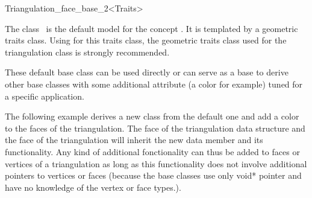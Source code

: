 

\begin{ccRefClass}{Triangulation_face_base_2<Traits>}  %

\ccDefinition
  
The class \ccRefName\ is the default  model for the concept
.
It is  templated by a geometric traits class.
Using for this traits class, the geometric traits class used for the triangulation class
is strongly recommended. 

These default base class can be used directly or can serve as a base to derive
other base classes with some additional attribute (a color for example)
tuned for a specific application.


\ccIsModel
{}

\ccSeeAlso
{}


\ccExample
The following example derives a new  class from the default
one and add a color to the faces of the triangulation. 
The face of the triangulation data structure
and the face of the triangulation will inherit the new data member 
and its functionality.
Any kind of additional fonctionality can thus be added to faces or vertices of a triangulation 
as long as this functionality  does not involve additional pointers to vertices or faces
(because the base classes use only void* pointer and have no knowledge
of the vertex or face types.).





\end{ccRefClass}



